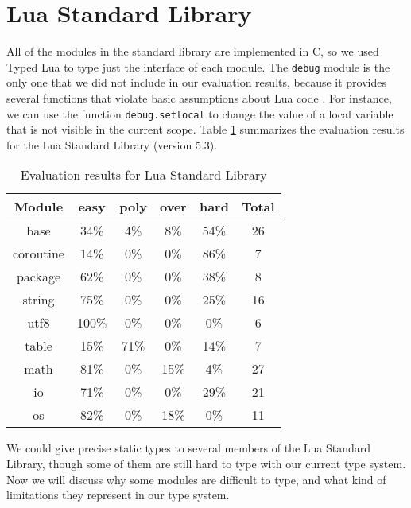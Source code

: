 \section{Lua Standard Library}

All of the modules in the standard library are implemented in C, so
we used Typed Lua to type just the interface of each module.
The \texttt{debug} module is the only one that we did not include in our
evaluation results, because it provides several functions that violate
basic assumptions about Lua code \citep{luamanual}.
For instance, we can use the function \texttt{debug.setlocal} to change the value
of a local variable that is not visible in the current scope.
Table \ref{tab:evallsl} summarizes the evaluation results for the Lua Standard Library
(version 5.3).

\begin{table}[!ht]
\begin{center}
\begin{tabular}{|c|c|c|c|c|c|}
\hline
\textbf{Module} & \textbf{easy} & \textbf{poly} & \textbf{over} & \textbf{hard} & \textbf{Total} \\
\hline
base & 34\% & 4\% & 8\% & 54\% & 26 \\ %
\hline
coroutine & 14\% & 0\% & 0\% & 86\% & 7 \\ %
\hline
package & 62\% & 0\% & 0\% & 38\% & 8 \\ %
\hline
string & 75\% & 0\% & 0\% & 25\% & 16 \\ %
\hline
utf8 & 100\% & 0\% & 0\% & 0\% & 6 \\ %
\hline
table & 15\% & 71\% & 0\% & 14\% & 7 \\ %
\hline
math & 81\% & 0\% & 15\% & 4\% & 27 \\ %
\hline
io & 71\% & 0\% & 0\% & 29\% & 21 \\ %
\hline
os & 82\% & 0\% & 18\% & 0\% & 11 \\ %
\hline
\end{tabular}
\end{center}
\caption{Evaluation results for Lua Standard Library}
\label{tab:evallsl}
\end{table}

We could give precise static types to several members of
the Lua Standard Library, though some of them are still
hard to type with our current type system.
Now we will discuss why some modules are difficult to type,
and what kind of limitations they represent in our type system.

